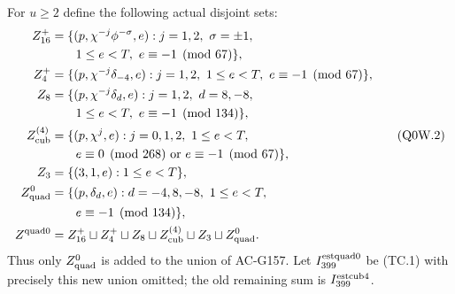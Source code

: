For $u\geq2$ define the following actual disjoint sets:
\[
 \begin{aligned}
 Z_{16}^+&=\{(p,\chi^{-j}\phi^{-\sigma},e):j=1,2,\ \sigma=\pm1,\\
 &\hspace{2em}1\leq e<T,\ e\equiv-1\pmod{67}\},\\
 Z_4^+&=\{(p,\chi^{-j}\delta_{-4},e):j=1,2,
               \ 1\leq e<T,\ e\equiv-1\pmod{67}\},\\
 Z_8&=\{(p,\chi^{-j}\delta_d,e):j=1,2,\ d=8,-8,\\
 &\hspace{2em}1\leq e<T,\ e\equiv-1\pmod{134}\},\\
 Z_{\rm cub}^{(4)}&=\{(p,\chi^j,e):j=0,1,2,\ 1\leq e<T,\\
 &\hspace{2em}e\equiv0\pmod{268}\ \text{or}\ e\equiv-1\pmod{67}\},\\
 Z_3&=\{(3,1,e):1\leq e<T\},\\
 Z_{\rm quad}^0&=\{(p,\delta_d,e):d=-4,8,-8,\ 1\leq e<T,\\
 &\hspace{2em}e\equiv-1\pmod{134}\},\\
 Z^{\rm quad0}&=Z_{16}^+\sqcup Z_4^+\sqcup Z_8
                 \sqcup Z_{\rm cub}^{(4)}\sqcup Z_3\sqcup Z_{\rm quad}^0.
 \end{aligned}
 \tag{Q0W.2}
\]
Thus only $Z_{\rm quad}^0$ is added to the union of AC-G157.
Let $I_{399}^{\rm estquad0}$ be (TC.1) with precisely this new
union omitted; the old remaining sum is $I_{399}^{\rm estcub4}$.

